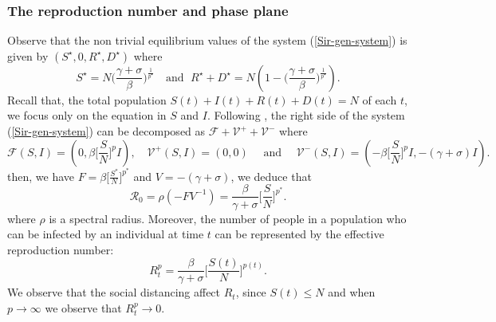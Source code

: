 \documentclass[final,a4paper,reqno]{elsarticle}
\numberwithin{equation}{section}
\begin{document}
\subsubsection{The reproduction number and phase plane}
\noindent Observe that the non trivial equilibrium values of the system (\ref{Sir-gen-system}) is given by $(S^\star,0,R^\star,D^\star)$ where
 $$\displaystyle S^\star= N\Big(\frac{\gamma+\sigma}{\beta}\Big)^{\frac{1}{p^\star}} \quad \mbox{and }\;  R^\star+D^\star=N(1-\Big(\frac{\gamma+\sigma}{\beta}\Big)^{\frac{1}{p^\star}} ).$$ 
Recall that, the total population $S(t) + I(t) + R(t) +D(t)=N$  of each $t$, we focus only on the equation
in $S$ and $I$. Following \cite{DrWat, DiHe},  the right side of the  system (\ref{Sir-gen-system})  can be decomposed as 
$\displaystyle \mathcal{F}+\mathcal{V}^++\mathcal{V}^-$ where 
$$\displaystyle \mathcal{F}(S,I)= (0,{\beta} \Big[\frac{S}{N}\Big]^{p} I ), \quad \mathcal{V}^+(S,I)=(0,0) \quad \mbox{ and }\quad \mathcal{V}^-(S,I)=(-{\beta} \Big[\frac{S}{N}\Big]^{p} I,-(\gamma+\sigma) I ).$$
then, we have $\displaystyle F= {\beta} \Big[\frac{S^*}{N}\Big]^{p^*} $ and $V=-(\gamma+\sigma)$, we deduce that 
 $$\mathcal{R}_{0}= \rho(-FV^{-1})= \frac{\beta}{\gamma+\sigma} \Big[\frac{S}{N}\Big]^{p^*} .$$
 where $\rho$ is a spectral radius. Moreover, the number of people in a population who can be infected by an individual at time $t$ can be represented by  the effective reproduction number:   $$R^p_t= \frac{\beta}{\gamma+\sigma} \Big[\frac{S(t)}{N}\Big]^{p(t)}.$$ 
 We observe that the social distancing affect $R_t$, since $S(t)\leq N$ and when $p\to \infty$ we observe that $R^p_t \to 0.$
\end{document}

